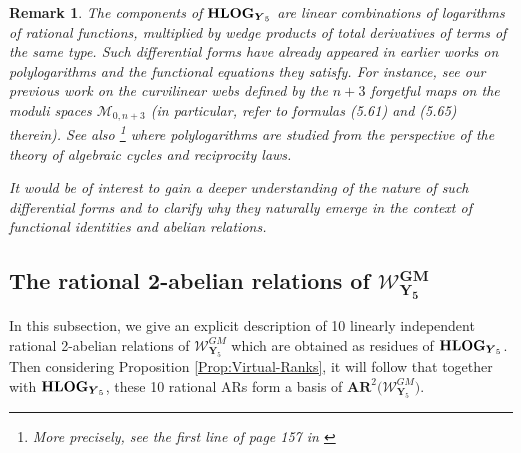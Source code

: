 \documentclass[11pt]{amsart}
\newtheorem{rem}[thm]{Remark}
\begin{document}
\begin{rem}%
The components of ${\bf HLOG}_{ \boldsymbol{Y}_5}$ are linear combinations of logarithms of rational functions, multiplied by wedge products of total derivatives of terms of the same type.  Such differential forms have already appeared in earlier works on polylogarithms and the functional equations they satisfy. For instance, see our previous work \cite{PirioWM06} on the curvilinear webs defined by the $n + 3 $ forgetful maps on the moduli spaces $\mathcal M_{0,n+3}$ (in particular, refer to formulas (5.61) and (5.65) therein). See also \cite{KLL}\footnote{More precisely, see the first line of page 157 in \cite{KLL}} where polylogarithms are studied from the perspective of the theory of algebraic cycles and reciprocity laws.

It would be of interest to gain a deeper understanding of the nature of such differential forms and to clarify why they naturally emerge in the context of functional identities and abelian relations.
\end{rem}%

\subsection{\bf The rational 2-abelian relations of $\boldsymbol{{\mathcal W}^{GM}_{ {Y}_5}}$}
\label{SS:2-AR-of-WGMY5}
In this subsection, we give an explicit description of 10 linearly independent 
rational 
2-abelian relations  of 
$\boldsymbol{\mathcal W}^{GM}_{ \boldsymbol{Y}_5}$
which  are obtained as residues of ${\bf HLOG}_{\boldsymbol{Y}_5}$. 
Then considering Proposition \ref{Prop:Virtual-Ranks}, it will follow that together with 
${\bf HLOG}_{\boldsymbol{Y}_5}$, 
these 10 rational ARs  form a basis of  
 $\boldsymbol{AR}^2\big( 
\boldsymbol{\mathcal W}^{GM}_{ \boldsymbol{Y}_5} \big)$. 
\end{document}
